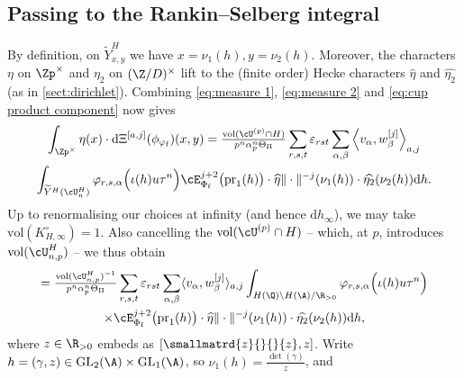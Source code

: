 \documentclass[10pt,reqno,a4paper]{amsart}
\newcommand{\Phif}{{\Phi\subf}}
\newcommand{\etahat}{\widehat{\eta}}
\newcommand{\subf}{_{\mathrm{f}}}
\newcommand{\GL}{\mathrm{GL}}
\begin{document}
\subsection{Passing to the Rankin--Selberg integral}
By definition, on $\widetilde{Y}_{x,y}^{H}$ we have $x = \nu_1(h), y =\nu_2(h)$. Moreover, the characters $\eta$ on $\Zp^\times$ and $\eta_2$ on $(\Z/D)^\times$ lift to the (finite order) Hecke characters $\etahat$  and $\widehat{\eta_2}$ (as in \cref{sect:dirichlet}). Combining \eqref{eq:measure 1}, \eqref{eq:measure 2} and \eqref{eq:cup product component} now gives
\begin{multline*}
\int_{\Zp^\times} \eta(x)  \cdot \mathrm{d}\Xi^{[a,j]}(\phi_{\varphi\subf})(x,y) =
\tfrac{\operatorname{vol}(\cU^{(p)} \cap H)}{p^{n}\alpha_{p}^n\Theta_\Pi} \sum_{r,s,t} \varepsilon_{rst} \sum_{\alpha,\beta} \left\langle v_\alpha, w_\beta^{[j]}\right\rangle_{a,j}\\
\int_{\widetilde{Y}^H(\cU_{n}^H)}  \varphi_{r,s,\alpha}\Big(\iota(h)u\tau^{n}\Big)   \cE_{\Phif}^{j+2} \big(\mathrm{pr}_1(h)\big) \cdot \etahat\|\cdot\|^{-j}(\nu_1(h))\cdot  \widehat{\eta_2}(\nu_2(h)) \mathrm{d}h.
\end{multline*}
Up to renormalising our choices at infinity (and hence $\mathrm{d}h_\infty$), we may take $\mathrm{vol}(K_{H,\infty}^\circ) = 1$. Also cancelling the $\mathrm{vol}(\cU^{(p)}\cap H)$ -- which, at $p$, introduces $\mathrm{vol}(\cU_{n,p}^H)$ -- we thus obtain
\begin{multline*}
= \tfrac{\operatorname{vol}(\cU_{n,p}^H)^{-1}}{{p^{n}\alpha_{p}^n} \Theta_\Pi} \sum_{r,s,t} \varepsilon_{rst} \sum_{\alpha,\beta} \langle v_\alpha, w_\beta^{[j]}\rangle_{a,j}
\int_{H(\Q)\backslash H(\A)/\R_{>0}}  \varphi_{r,s,\alpha}\Big(\iota(h)u\tau^{n}\Big)   \\ \times \cE_{\Phif}^{j+2} \big(\mathrm{pr}_1(h)\big) \cdot \etahat\|\cdot\|^{-j}(\nu_1(h)) \cdot \widehat{\eta_2}(\nu_2(h))   \mathrm{d}h,
\end{multline*}
where $z \in \R_{>0}$ embeds as $[\smallmatrd{z}{}{}{z}, z]$. Write $h = (\gamma, z) \in \GL_2(\A) \times \GL_1(\A)$, so $\nu_1(h) = \tfrac{\det(\gamma)}{z}$, and
\end{document}
